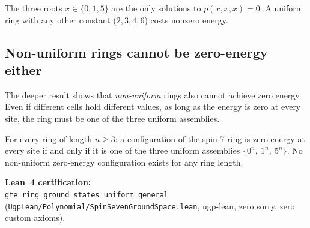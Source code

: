 \documentclass[11pt,a4paper]{article}
\newcommand{\lean}[1]{\texttt{#1}}
\begin{document}
\bigskip
\begin{center}
\end{center}
\bigskip

\noindent
The three roots $x \in \{0,1,5\}$ are the only solutions to $p(x,x,x)=0$.
A uniform ring with any other constant ($2,3,4,6$) costs nonzero energy.

\subsection{Non-uniform rings cannot be zero-energy either}

The deeper result shows that \emph{non-uniform} rings also cannot achieve
zero energy.  Even if different cells hold different values, as long as the
energy is zero at every site, the ring must be one of the three uniform
assemblies.

\begin{tcolorbox}[colback=boxgreen,colframe=green!50!black,breakable,
  title={Theorem: Ground-Space Rigidity (machine-certified, zero sorry)}]
For every ring of length $n \geq 3$: a configuration of the spin-7 ring is
zero-energy at every site if and only if it is one of the three uniform
assemblies $\{0^n,\ 1^n,\ 5^n\}$.  No non-uniform zero-energy configuration
exists for any ring length.

\smallskip\noindent
\textbf{Lean~4 certification:}\\
\lean{gte\_ring\_ground\_states\_uniform\_general}\\
(\texttt{UgpLean/Polynomial/SpinSevenGroundSpace.lean},
ugp-lean, zero sorry, zero custom axioms).
\end{tcolorbox}
\end{document}
